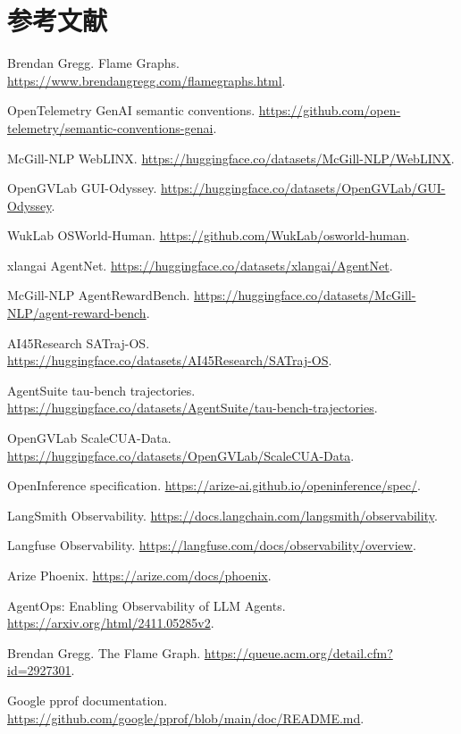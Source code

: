 \documentclass[10pt,twocolumn]{ctexart}
\begin{document}
\section*{参考文献}
\tiny
\setlength{\parskip}{0pt}
\setlength{\baselineskip}{6.2pt}
\noindent [1] Brendan Gregg. Flame Graphs. \url{https://www.brendangregg.com/flamegraphs.html}.\par
\noindent [2] OpenTelemetry GenAI semantic conventions. \url{https://github.com/open-telemetry/semantic-conventions-genai}.\par
\noindent [3] McGill-NLP WebLINX. \url{https://huggingface.co/datasets/McGill-NLP/WebLINX}.\par
\noindent [4] OpenGVLab GUI-Odyssey. \url{https://huggingface.co/datasets/OpenGVLab/GUI-Odyssey}.\par
\noindent [5] WukLab OSWorld-Human. \url{https://github.com/WukLab/osworld-human}.\par
\noindent [6] xlangai AgentNet. \url{https://huggingface.co/datasets/xlangai/AgentNet}.\par
\noindent [7] McGill-NLP AgentRewardBench. \url{https://huggingface.co/datasets/McGill-NLP/agent-reward-bench}.\par
\noindent [8] AI45Research SATraj-OS. \url{https://huggingface.co/datasets/AI45Research/SATraj-OS}.\par
\noindent [9] AgentSuite tau-bench trajectories. \url{https://huggingface.co/datasets/AgentSuite/tau-bench-trajectories}.\par
\noindent [10] OpenGVLab ScaleCUA-Data. \url{https://huggingface.co/datasets/OpenGVLab/ScaleCUA-Data}.\par
\noindent [11] OpenInference specification. \url{https://arize-ai.github.io/openinference/spec/}.\par
\noindent [12] LangSmith Observability. \url{https://docs.langchain.com/langsmith/observability}.\par
\noindent [13] Langfuse Observability. \url{https://langfuse.com/docs/observability/overview}.\par
\noindent [14] Arize Phoenix. \url{https://arize.com/docs/phoenix}.\par
\noindent [15] AgentOps: Enabling Observability of LLM Agents. \url{https://arxiv.org/html/2411.05285v2}.\par
\noindent [16] Brendan Gregg. The Flame Graph. \url{https://queue.acm.org/detail.cfm?id=2927301}.\par
\noindent [17] Google pprof documentation. \url{https://github.com/google/pprof/blob/main/doc/README.md}.\par
\end{document}
